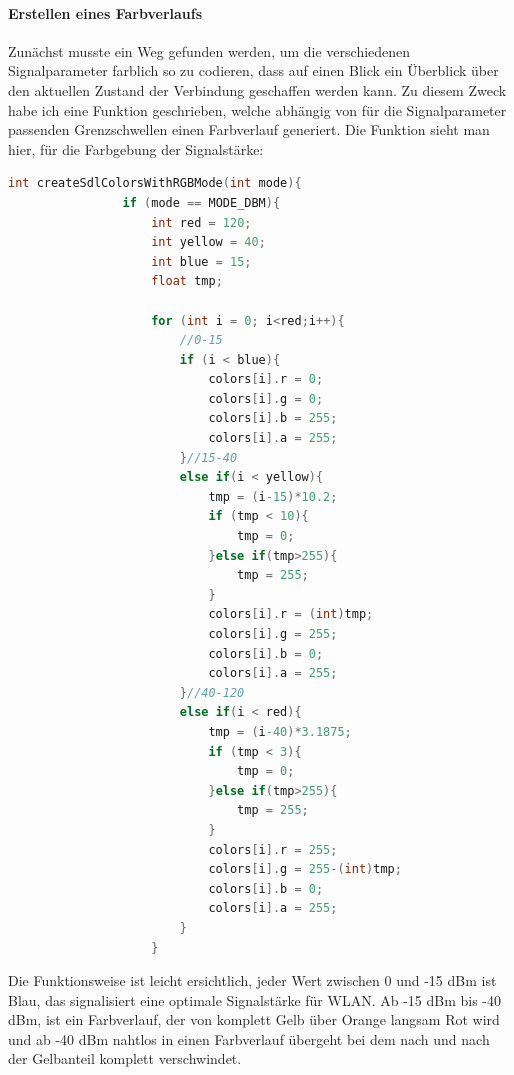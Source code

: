 \paragraph*{Erstellen eines Farbverlaufs}
Zunächst musste ein Weg gefunden werden, um die verschiedenen Signalparameter farblich so zu codieren, dass auf einen Blick ein Überblick über den aktuellen Zustand der Verbindung geschaffen werden kann. Zu diesem Zweck habe ich eine Funktion geschrieben, welche abhängig von für die Signalparameter passenden Grenzschwellen einen Farbverlauf generiert. Die Funktion sieht man hier, für die Farbgebung der Signalstärke: \\
\begin{lstlisting}[caption={Codeausschnitt - Generierung von Farbgradienten},captionpos=b,language=C]
        int createSdlColorsWithRGBMode(int mode){
                if (mode == MODE_DBM){
                    int red = 120;
                    int yellow = 40;
                    int blue = 15;
                    float tmp;
    
                    for (int i = 0; i<red;i++){
                        //0-15
                        if (i < blue){
                            colors[i].r = 0;
                            colors[i].g = 0;
                            colors[i].b = 255;
                            colors[i].a = 255;
                        }//15-40
                        else if(i < yellow){
                            tmp = (i-15)*10.2;
                            if (tmp < 10){
                                tmp = 0;
                            }else if(tmp>255){
                                tmp = 255;
                            }
                            colors[i].r = (int)tmp;
                            colors[i].g = 255;
                            colors[i].b = 0;
                            colors[i].a = 255;           
                        }//40-120
                        else if(i < red){
                            tmp = (i-40)*3.1875;
                            if (tmp < 3){
                                tmp = 0;
                            }else if(tmp>255){
                                tmp = 255;
                            }
                            colors[i].r = 255;
                            colors[i].g = 255-(int)tmp;
                            colors[i].b = 0;
                            colors[i].a = 255;            
                        }   
                    }
\end{lstlisting}
Die Funktionsweise ist leicht ersichtlich, jeder Wert zwischen 0 und -15 dBm ist Blau, das signalisiert eine optimale Signalstärke für WLAN. Ab -15 dBm bis -40 dBm, ist ein Farbverlauf, der von komplett Gelb über Orange langsam Rot wird und ab -40 dBm nahtlos in einen Farbverlauf übergeht bei dem nach und nach der Gelbanteil komplett verschwindet. 
